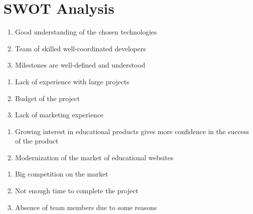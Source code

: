 \documentclass[a4paper,11pt,twoside]{report}
\theoremstyle{definition}
\begin{document}
\chapter*{SWOT Analysis}
\begin{tcbraster}[raster columns=2, boxrule=0mm, arc=0mm]
\begin{tcolorbox}[equal height group=A, size=fbox, colback=swotS!60, colframe=swotS!80!black, title=\textsc{strengths}]
\begin{enumerate}
\item Good understanding of the chosen technologies
\item Team of skilled well-coordinated developers 
\item Milestones are well-defined and understood
\end{enumerate}
\end{tcolorbox}
\begin{tcolorbox}[equal height group=A, size=fbox, colback=swotW!60, colframe=swotW!80!black, title=\textsc{weaknesses}]
\begin{enumerate}
\item Lack of experience with large projects
\item Budget of the project
\item Lack of marketing experience
\end{enumerate}
\end{tcolorbox}
\begin{tcolorbox}[equal height group=B, size=fbox, colback=swotO!60, colframe=swotO!80!black, title=\textsc{opportunities}]
\begin{enumerate}
\item Growing interest in educational products gives more confidence in the success of the product
\item Modernization of the market of educational websites  
\end{enumerate}
\end{tcolorbox}
\begin{tcolorbox}[equal height group=B, size=fbox, colback=swotT!60, colframe=swotT!80!black, title=\textsc{threats}]
\begin{enumerate}
\item Big competition on the market
\item Not enough time to complete the project
\item Absence of team members due to some reasons
\end{enumerate}
\end{tcolorbox}
\end{tcbraster}
\end{document}
